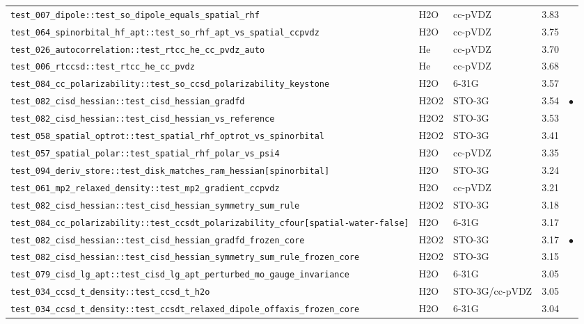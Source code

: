 \documentclass[10pt]{article}
\begin{document}
\begin{longtable}{l l l r c}
\texttt{test\_007\_dipole::test\_so\_dipole\_equals\_spatial\_rhf} & H2O & cc-pVDZ & 3.83 &  \\
\texttt{test\_064\_spinorbital\_hf\_apt::test\_so\_rhf\_apt\_vs\_spatial\_ccpvdz} & H2O & cc-pVDZ & 3.75 &  \\
\texttt{test\_026\_autocorrelation::test\_rtcc\_he\_cc\_pvdz\_auto} & He & cc-pVDZ & 3.70 &  \\
\texttt{test\_006\_rtccsd::test\_rtcc\_he\_cc\_pvdz} & He & cc-pVDZ & 3.68 &  \\
\texttt{test\_084\_cc\_polarizability::test\_so\_ccsd\_polarizability\_keystone} & H2O & 6-31G & 3.57 &  \\
\texttt{test\_082\_cisd\_hessian::test\_cisd\_hessian\_gradfd} & H2O2 & STO-3G & 3.54 & $\bullet$ \\
\texttt{test\_082\_cisd\_hessian::test\_cisd\_hessian\_vs\_reference} & H2O2 & STO-3G & 3.53 &  \\
\texttt{test\_058\_spatial\_optrot::test\_spatial\_rhf\_optrot\_vs\_spinorbital} & H2O2 & STO-3G & 3.41 &  \\
\texttt{test\_057\_spatial\_polar::test\_spatial\_rhf\_polar\_vs\_psi4} & H2O & cc-pVDZ & 3.35 &  \\
\texttt{test\_094\_deriv\_store::test\_disk\_matches\_ram\_hessian[spinorbital]} & H2O & STO-3G & 3.24 &  \\
\texttt{test\_061\_mp2\_relaxed\_density::test\_mp2\_gradient\_ccpvdz} & H2O & cc-pVDZ & 3.21 &  \\
\texttt{test\_082\_cisd\_hessian::test\_cisd\_hessian\_symmetry\_sum\_rule} & H2O2 & STO-3G & 3.18 &  \\
\texttt{test\_084\_cc\_polarizability::test\_ccsdt\_polarizability\_cfour[spatial-water-false]} & H2O & 6-31G & 3.17 &  \\
\texttt{test\_082\_cisd\_hessian::test\_cisd\_hessian\_gradfd\_frozen\_core} & H2O2 & STO-3G & 3.17 & $\bullet$ \\
\texttt{test\_082\_cisd\_hessian::test\_cisd\_hessian\_symmetry\_sum\_rule\_frozen\_core} & H2O2 & STO-3G & 3.15 &  \\
\texttt{test\_079\_cisd\_lg\_apt::test\_cisd\_lg\_apt\_perturbed\_mo\_gauge\_invariance} & H2O & 6-31G & 3.05 &  \\
\texttt{test\_034\_ccsd\_t\_density::test\_ccsd\_t\_h2o} & H2O & STO-3G/cc-pVDZ & 3.05 &  \\
\texttt{test\_034\_ccsd\_t\_density::test\_ccsdt\_relaxed\_dipole\_offaxis\_frozen\_core} & H2O & 6-31G & 3.04 &  \\

\end{longtable}
\end{document}
